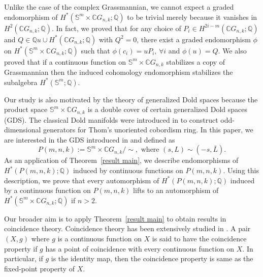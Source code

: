 \documentclass{amsart}
\newcommand{\thmref}[1]{Theorem~\ref{#1}}
\begin{document}
	Unlike %
the case of the complex Grassmannian, we cannot expect a graded
	endomorphism of $H^*(\mathbb S^m \times \mathbb CG_{n,k};\mathbb Q)$ to be
	trivial merely because it vanishes in $H^2(\mathbb{C}G_{n,k}; \mathbb{Q})$. 
	In fact, we proved that for any choice of $P_i \in H^{2i-m}(\mathbb{C}G_{n,k};\mathbb{Q})$ and $Q\in \mathbb Qu\cup  H^*(\mathbb CG_{n,k};\mathbb Q)$ with $Q^2=0$, there exist a graded endomorphism $\phi$ on $H^*(\mathbb S^m \times \mathbb CG_{n,k};\mathbb Q)$ such that $\phi(c_i) = uP_i, \, \forall i$ and $\phi(u)=Q$.
	We also proved that if a continuous function on $\mathbb S^m \times \mathbb CG_{n,k}$ stabilizes a copy of Grassmannian then the induced cohomology endomorphism stabilizes the subalgebra $H^*(\mathbb S^m ;\mathbb Q)$.
	
	Our study is also motivated by the theory of generalized Dold spaces because the product space $\mathbb S^m \times \mathbb CG_{n,k}$ is a double cover of certain  generalized Dold spaces (GDS). %
	The classical Dold manifolds were introduced in \cite{dold} to construct odd-dimensional generators for Thom's unoriented cobordism ring. In this paper, we are interested in the GDS introduced in \cite{nath-sankaran} and defined as  %
	\[
	P(m,n,k):=\mathbb S^m\times \mathbb CG_{n,k}/\!\!\sim, \text { where } (s,L)\sim (-s,\bar L).
	\]
	As an application of \thmref{result main}, we describe endomorphisms of $H^*(P(m,n,k);\mathbb{Q})$ induced by continuous functions on $P(m,n,k)$. Using this description, we prove that every automorphism of $H^*(P(m,n,k);\mathbb{Q})$ induced by a continuous function on $P(m,n,k)$ lifts to an automorphism of $H^*(\mathbb S^m\times \mathbb CG_{n,k}; \mathbb{Q})$ if $n>2$. 
	
	Our broader aim is to apply \thmref{result main} to obtain results in coincidence theory. Coincidence theory has been extensively studied in \cite{hoffman-noncoin, glover-homer coin, wong}. %
	A pair $(X,g)$ where $g$ is a continuous function on $X$ is said to have the coincidence property if $g$ has a point of coincidence with every continuous function on $X$. In particular, if $g$ is the identity map, then the coincidence property %
is same as %
the fixed-point property of $X$.
	
\end{document}
